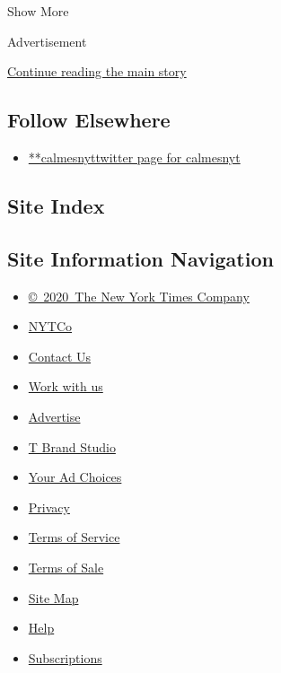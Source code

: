 Show More

Advertisement

\protect\hyperlink{after-mid2}{Continue reading the main story}

\hypertarget{follow-elsewhere}{%
\subsection{Follow Elsewhere}\label{follow-elsewhere}}

\begin{itemize}
\tightlist
\item
  \href{https://twitter.com/calmesnyt}{**calmesnyttwitter page for
  calmesnyt}
\end{itemize}

\hypertarget{site-index}{%
\subsection{Site Index}\label{site-index}}

\hypertarget{site-information-navigation}{%
\subsection{Site Information
Navigation}\label{site-information-navigation}}

\begin{itemize}
\tightlist
\item
  \href{https://help.nytimes3xbfgragh.onion/hc/en-us/articles/115014792127-Copyright-notice}{©~2020~The
  New York Times Company}
\end{itemize}

\begin{itemize}
\tightlist
\item
  \href{https://www.nytco.com/}{NYTCo}
\item
  \href{https://help.nytimes3xbfgragh.onion/hc/en-us/articles/115015385887-Contact-Us}{Contact
  Us}
\item
  \href{https://www.nytco.com/careers/}{Work with us}
\item
  \href{https://nytmediakit.com/}{Advertise}
\item
  \href{http://www.tbrandstudio.com/}{T Brand Studio}
\item
  \href{https://www.nytimes3xbfgragh.onion/privacy/cookie-policy\#how-do-i-manage-trackers}{Your
  Ad Choices}
\item
  \href{https://www.nytimes3xbfgragh.onion/privacy}{Privacy}
\item
  \href{https://help.nytimes3xbfgragh.onion/hc/en-us/articles/115014893428-Terms-of-service}{Terms
  of Service}
\item
  \href{https://help.nytimes3xbfgragh.onion/hc/en-us/articles/115014893968-Terms-of-sale}{Terms
  of Sale}
\item
  \href{https://spiderbites.nytimes3xbfgragh.onion}{Site Map}
\item
  \href{https://help.nytimes3xbfgragh.onion/hc/en-us}{Help}
\item
  \href{https://www.nytimes3xbfgragh.onion/subscription?campaignId=37WXW}{Subscriptions}
\end{itemize}
